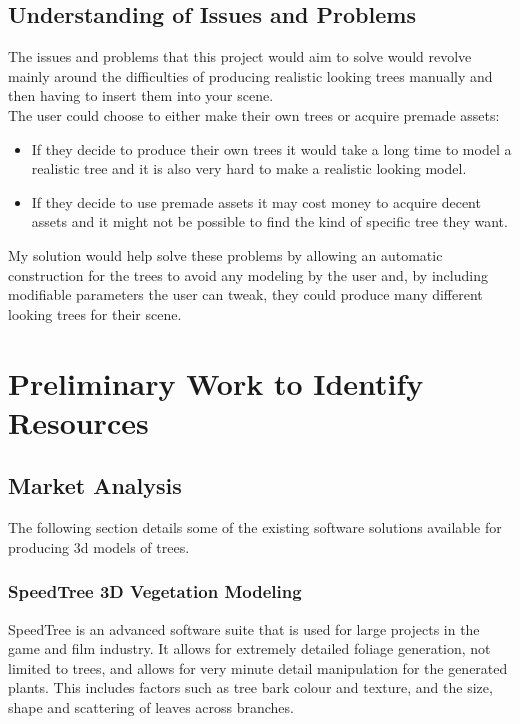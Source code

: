 \documentclass[proposal]{cmpreport}
\begin{document}
\subsection{Understanding of Issues and Problems}
The issues and problems that this project would aim to solve would revolve mainly 
around the difficulties of producing realistic looking trees manually and then having 
to insert them into your scene. \\

The user could choose to either make their own trees or acquire premade assets:
\begin{itemize}
        \item If they decide to produce their own trees it would take a long time to 
              model a realistic tree and it is also very hard to make a realistic 
              looking model.
        \item If they decide to use premade assets it may cost money to acquire decent 
              assets and it might not be possible to find the kind of specific tree they 
              want. 
\end{itemize}

My solution would help solve these problems by allowing an automatic construction 
for the trees to avoid any modeling by the user and, by including modifiable parameters 
the user can tweak, they could produce many different looking trees for their scene.


\section{Preliminary Work to Identify Resources}

\subsection{Market Analysis}
The following section details some of the existing software solutions available for 
producing 3d models of trees.

\subsubsection{SpeedTree 3D Vegetation Modeling}
SpeedTree \cite{speedtree} is an advanced software suite that is used for large projects 
in the game and film industry. It allows for extremely detailed foliage generation, 
not limited to trees, and allows for very minute detail manipulation for the generated 
plants. This includes factors such as tree bark colour and texture, and the size, shape 
and scattering of leaves across branches.
\end{document}
